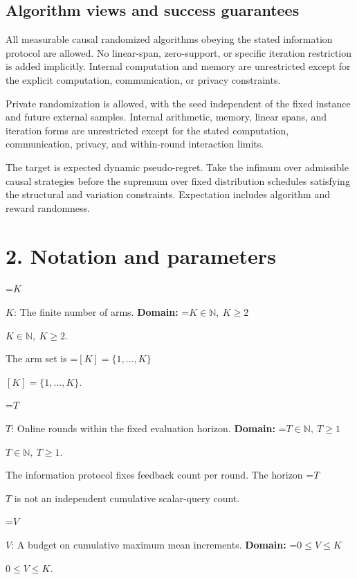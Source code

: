 \documentclass[10pt,a4paper]{article}
\newcommand{\AtlasMath}[1]{\par\begingroup\centering\setbox0=\hbox{$\displaystyle #1$}\ifdim\wd0>1.4\linewidth\typeout{ATLAS WIDE FORMULA: \the\wd0}\fi\ifdim\wd0>\linewidth\resizebox{\linewidth}{!}{\box0}\else\box0\fi\par\endgroup}
\newcommand{\AtlasInlineMath}[1]{\begingroup\setbox0=\hbox{$#1$}\ifdim\wd0>.4\linewidth\endgroup\AtlasMath{#1}\else\endgroup$#1$\fi}
\begin{document}
\subsection{Algorithm views and success guarantees}


All measurable causal randomized algorithms obeying the stated information protocol are allowed. No linear-span, zero-support, or specific iteration restriction is added implicitly. Internal computation and memory are unrestricted except for the explicit computation, communication, or privacy constraints.



Private randomization is allowed, with the seed independent of the fixed instance and future external samples. Internal arithmetic, memory, linear spans, and iteration forms are unrestricted except for the stated computation, communication, privacy, and within-round interaction limits.



The target is expected dynamic pseudo-regret. Take the infimum over admissible causal strategies before the supremum over fixed distribution schedules satisfying the structural and variation constraints. Expectation includes algorithm and reward randomness.



\section{2. Notation and parameters}


\AtlasInlineMath{K}: The finite number of arms. \textbf{Domain:} \AtlasInlineMath{K\in\mathbb N,\ K\ge2}.



The arm set is \AtlasInlineMath{[K]=\{1,\ldots,K\}}.



\AtlasInlineMath{T}: Online rounds within the fixed evaluation horizon. \textbf{Domain:} \AtlasInlineMath{T\in\mathbb N,\ T\ge1}.



The information protocol fixes feedback count per round. The horizon \AtlasInlineMath{T} is not an independent cumulative scalar-query count.



\AtlasInlineMath{V}: A budget on cumulative maximum mean increments. \textbf{Domain:} \AtlasInlineMath{0\le V\le K}.
\end{document}
